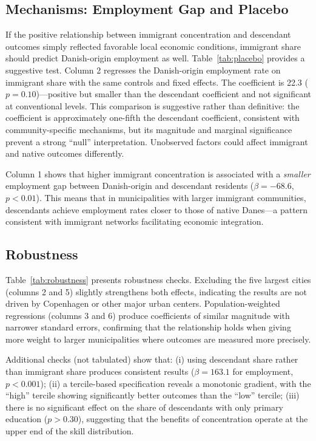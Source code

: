 \documentclass[12pt]{article}
\begin{document}
\subsection{Mechanisms: Employment Gap and Placebo}



If the positive relationship between immigrant concentration and descendant outcomes simply reflected favorable local economic conditions, immigrant share should predict Danish-origin employment as well. Table~\ref{tab:placebo} provides a suggestive test. Column 2 regresses the Danish-origin employment rate on immigrant share with the same controls and fixed effects. The coefficient is 22.3 ($p = 0.10$)---positive but smaller than the descendant coefficient and not significant at conventional levels. This comparison is suggestive rather than definitive: the coefficient is approximately one-fifth the descendant coefficient, consistent with community-specific mechanisms, but its magnitude and marginal significance prevent a strong ``null'' interpretation. Unobserved factors could affect immigrant and native outcomes differently.

Column 1 shows that higher immigrant concentration is associated with a \textit{smaller} employment gap between Danish-origin and descendant residents ($\beta = -68.6$, $p < 0.01$). This means that in municipalities with larger immigrant communities, descendants achieve employment rates closer to those of native Danes---a pattern consistent with immigrant networks facilitating economic integration.

\subsection{Robustness}



Table~\ref{tab:robustness} presents robustness checks. Excluding the five largest cities (columns 2 and 5) slightly strengthens both effects, indicating the results are not driven by Copenhagen or other major urban centers. Population-weighted regressions (columns 3 and 6) produce coefficients of similar magnitude with narrower standard errors, confirming that the relationship holds when giving more weight to larger municipalities where outcomes are measured more precisely.

Additional checks (not tabulated) show that: (i) using descendant share rather than immigrant share produces consistent results ($\beta = 163.1$ for employment, $p < 0.001$); (ii) a tercile-based specification reveals a monotonic gradient, with the ``high'' tercile showing significantly better outcomes than the ``low'' tercile; (iii) there is no significant effect on the share of descendants with only primary education ($p > 0.30$), suggesting that the benefits of concentration operate at the upper end of the skill distribution.
\end{document}
